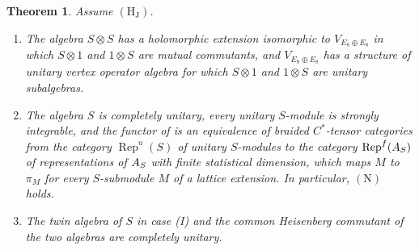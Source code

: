 \documentclass[leqno]{article}
\let\cal\relax
\newcommand{\cal}{\mathcal}
\newcommand{\ot}{\otimes}
\DeclareMathOperator{\Rep}{Rep} %
\newtheorem{thm}{Theorem}[section]
\numberwithin{equation}{section}
\begin{document}
\begin{thm}
\label{thm:intro-E}
Assume $\mathrm{(H_J)}$.
\begin{enumerate}
\item The algebra $S \ot S$ has a holomorphic extension isomorphic to $V_{E_8 \oplus E_8}$ in which $S \ot 1$ and $1 \ot S$ are mutual commutants, and $V_{E_8 \oplus E_8}$ has a structure of unitary vertex operator algebra for which $S \ot 1$ and $1 \ot S$ are unitary subalgebras.
\item The algebra $S$ is completely unitary, every unitary $S$-module is strongly integrable, and the functor of \cite[Section 3.4 p.~45]{Gui26} is an equivalence of braided $C^*$-tensor categories from the category $\Rep^u(S)$ of unitary $S$-modules to the category $\Rep^f(\cal A_S)$ of representations of $\cal A_S$ with finite statistical dimension, which maps $M$ to $\pi_M$ for every $S$-submodule $M$ of a lattice extension. In particular, $\mathrm{(N)}$ holds.
\item The twin algebra of $S$ in case (I) and the common Heisenberg commutant of the two algebras are completely unitary.
\end{enumerate}
\end{thm}
\end{document}
